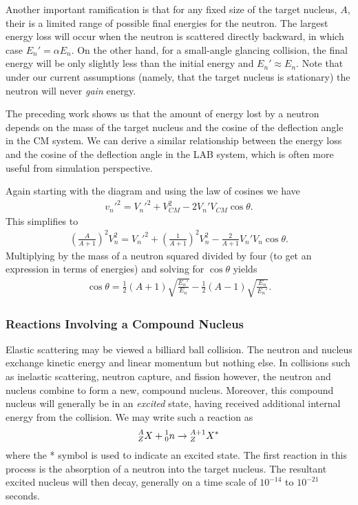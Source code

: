 \documentclass[11pt]{article}
\newcommand\leftidx[3]{{\vphantom{#2}}#1#2#3}
\begin{document}
Another important ramification is that for any fixed size of the target nucleus, \(A\), their is a limited range of possible final energies for the neutron.  The largest energy loss will occur when the neutron is scattered directly backward, in which case \(E_n' = \alpha E_n\).  On the other hand, for a small-angle glancing collision, the final energy will be only slightly less than the initial energy and \(E_n' \approx E_n\).  Note that under our current assumptions (namely, that the target nucleus is stationary) the neutron will never \emph{gain} energy.

The preceding work shows us that the amount of energy lost by a neutron depends on the mass of the target nucleus and the cosine of the deflection angle in the CM system.  We can derive a similar relationship between the energy loss and the cosine of the deflection angle in the LAB system, which is often more useful from simulation perspective.

Again starting with the diagram and using the law of cosines we have
\begin{align}
  v_n'^2 = V_n'^2 + V_{CM}^2 - 2 V_n' V_{CM} \cos\theta.
\end{align}
This simplifies to 
\begin{align}
  \left( \frac{A}{A+1} \right)^2 V_n^2 = V_n'^2 + \left( \frac{1}{A+1} \right)^2 V_n^2 - \frac{2}{A+1} V_n' V_n \cos\theta.
\end{align}
Multiplying by the mass of a neutron squared divided by four (to get an expression in terms of energies) and solving for \(\cos\theta\) yields
\begin{align}
  \cos\theta = \frac{1}{2}\left( A+1 \right) \sqrt{\frac{E_n'}{E_n}}
             - \frac{1}{2}\left( A-1 \right) \sqrt{\frac{E_n}{E_n'}}.
\end{align}

\subsubsection{Reactions Involving a Compound Nucleus}
\label{sec:orgheadline5}
Elastic scattering may be viewed a billiard ball collision.  The neutron and nucleus exchange kinetic energy and linear momentum but nothing else.  In collisions such as inelastic scattering, neutron capture, and fission however, the neutron and nucleus combine to form a new, compound nucleus.  Moreover, this compound nucleus will generally be in an \emph{excited} state, having received additional internal energy from the collision.  We may write such a reaction as
\begin{align}
  \leftidx{^A_Z}{X}{} + \leftidx{^1_0}{n}{} 
  \rightarrow \leftidx{^{A+1}_Z}{X}{^*}
\end{align}
where the * symbol is used to indicate an excited state.  The first reaction in this process is the absorption of a neutron into the target nucleus.  The resultant excited nucleus will then decay, generally on a time scale of \(10^{-14}\) to \(10^{-21}\) seconds.
\end{document}
